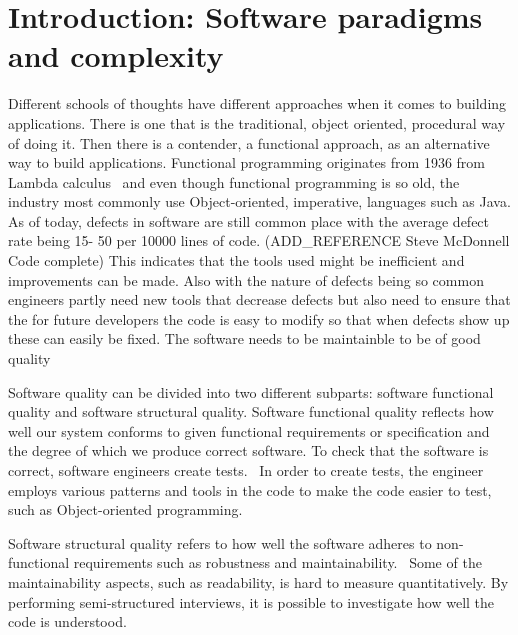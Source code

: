 \chapter{Introduction: Software paradigms and complexity}\label{introduction}

Different schools of thoughts have different approaches when it comes to
building applications. There is one that is the traditional, object oriented,
procedural way of doing it. Then there is a contender, a functional approach, as
an alternative way to build applications. Functional programming originates from
1936 from Lambda calculus~\cite{Turner} and even though functional programming
is so old, the industry most commonly use Object-oriented, imperative, languages
such as Java. As of today, defects in software are still common place with the
average defect rate being 15- 50 per 10000 lines of code. (ADD\_REFERENCE Steve
McDonnell Code complete) This indicates that the tools used might be inefficient
and improvements can be made. Also with the nature of defects being so common
engineers partly need new tools that decrease defects but also need to ensure
that the for future developers the code is easy to modify so that when defects
show up these can easily be fixed. The software needs to be maintainble to be of
good quality

Software quality can be divided into two different subparts: software functional
quality and software structural quality. Software functional quality reflects
how well our system conforms to given functional requirements or specification
and the degree of which we produce correct software.  To check that the software
is correct, software engineers create tests.~\cite{Pressman:2004:SEP:994110} In
order to create tests, the engineer employs various patterns and tools in the
code to make the code easier to test, such as Object-oriented programming.

Software structural quality refers to how well the software adheres to
non-functional requirements such as robustness and
maintainability.~\cite{Pressman:2004:SEP:994110} Some of the maintainability
aspects, such as readability, is hard to measure quantitatively. By performing
semi-structured interviews, it is possible to investigate how well the code is
understood. 

